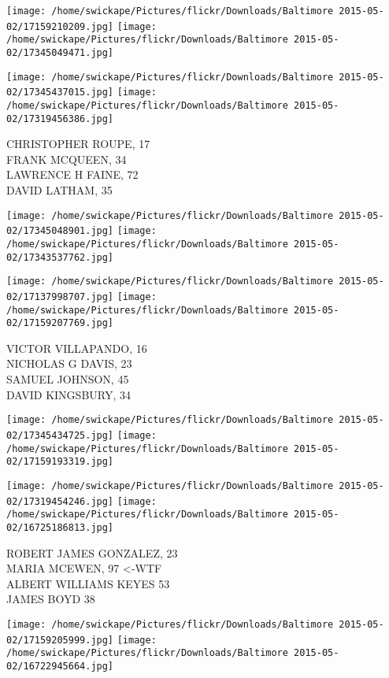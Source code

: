 \documentclass[10pt,letterpaper]{article}
\begin{document}
\texttt{[image: /home/swickape/Pictures/flickr/Downloads/Baltimore 2015-05-02/17159210209.jpg]}
\texttt{[image: /home/swickape/Pictures/flickr/Downloads/Baltimore 2015-05-02/17345049471.jpg]}

\texttt{[image: /home/swickape/Pictures/flickr/Downloads/Baltimore 2015-05-02/17345437015.jpg]}
\texttt{[image: /home/swickape/Pictures/flickr/Downloads/Baltimore 2015-05-02/17319456386.jpg]}

CHRISTOPHER ROUPE, 17\\
FRANK MCQUEEN, 34\\
LAWRENCE H FAINE, 72\\
DAVID LATHAM, 35\\
\pagebreak

\texttt{[image: /home/swickape/Pictures/flickr/Downloads/Baltimore 2015-05-02/17345048901.jpg]}
\texttt{[image: /home/swickape/Pictures/flickr/Downloads/Baltimore 2015-05-02/17343537762.jpg]}

\texttt{[image: /home/swickape/Pictures/flickr/Downloads/Baltimore 2015-05-02/17137998707.jpg]}
\texttt{[image: /home/swickape/Pictures/flickr/Downloads/Baltimore 2015-05-02/17159207769.jpg]}

VICTOR VILLAPANDO, 16\\
NICHOLAS G DAVIS, 23\\
SAMUEL JOHNSON, 45\\
DAVID KINGSBURY, 34\\
\pagebreak

\texttt{[image: /home/swickape/Pictures/flickr/Downloads/Baltimore 2015-05-02/17345434725.jpg]}
\texttt{[image: /home/swickape/Pictures/flickr/Downloads/Baltimore 2015-05-02/17159193319.jpg]}

\texttt{[image: /home/swickape/Pictures/flickr/Downloads/Baltimore 2015-05-02/17319454246.jpg]}
\texttt{[image: /home/swickape/Pictures/flickr/Downloads/Baltimore 2015-05-02/16725186813.jpg]}

ROBERT JAMES GONZALEZ, 23\\
MARIA MCEWEN, 97 <{-}WTF\\
ALBERT WILLIAMS KEYES 53\\
JAMES BOYD 38\\
\pagebreak

\texttt{[image: /home/swickape/Pictures/flickr/Downloads/Baltimore 2015-05-02/17159205999.jpg]}
\texttt{[image: /home/swickape/Pictures/flickr/Downloads/Baltimore 2015-05-02/16722945664.jpg]}
\end{document}
